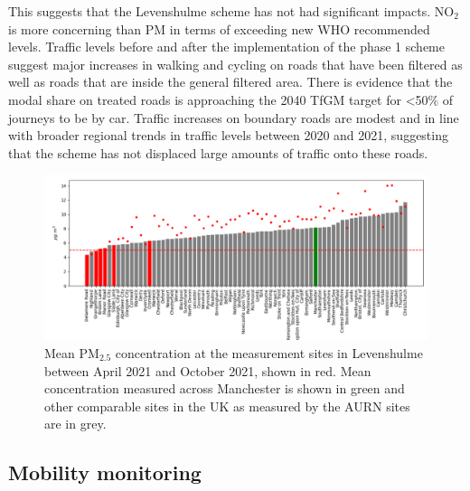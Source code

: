 \documentclass{article}
\begin{document}
\noindent This suggests that the Levenshulme scheme has not had significant impacts.  NO$_{2}$ is more concerning than PM in terms of exceeding new WHO recommended levels. Traffic levels before and after the implementation of the phase 1 scheme suggest major increases in walking and cycling on roads that have been filtered as well as roads that are inside the general filtered area. There is evidence that the modal share on treated roads is approaching the 2040 TfGM target for <50\% of journeys to be by car. Traffic increases on boundary roads are modest and in line with broader regional trends in traffic levels between 2020 and 2021, suggesting that the scheme has not displaced large amounts of traffic onto these roads.

\begin{figure}
	\centering
	\includegraphics[width=0.95\linewidth]{Figures/levvy_aurn.png}		
	\caption{Mean PM$_{2.5}$ concentration at the measurement sites in Levenshulme between April 2021 and October 2021, shown in red. Mean concentration measured across Manchester is shown in green and other comparable sites in the UK as measured by the AURN sites are in grey.} \label{fig::AURN}
\end{figure}

\clearpage
\subsection{Mobility monitoring}

\end{document}
